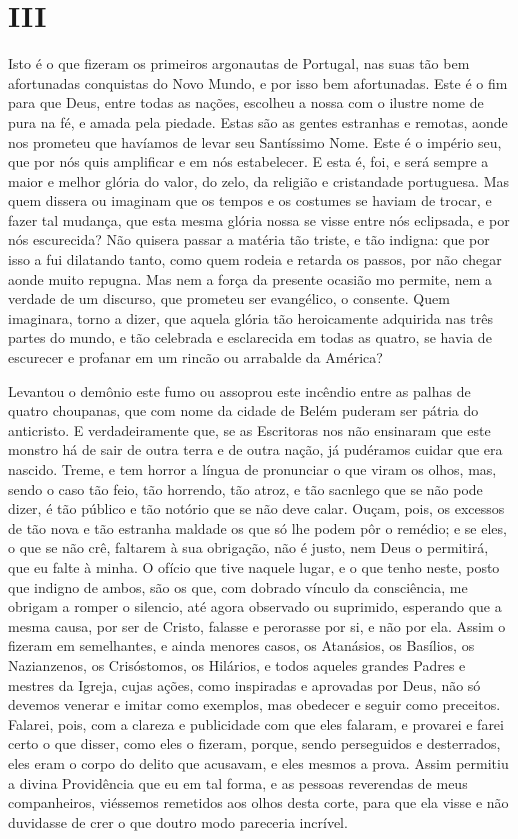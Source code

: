 \section*{III}

Isto é o que fizeram os primeiros argonautas de Portugal, nas suas tão
bem afortunadas conquistas do Novo Mundo, e por isso bem afortunadas.
Este é o fim para que Deus, entre todas as nações, escolheu a nossa com
o ilustre nome de pura na fé, e amada pela piedade. Estas são as gentes
estranhas e remotas, aonde nos prometeu que havíamos de levar seu
Santíssimo Nome. Este é o império seu, que por nós quis amplificar e em
nós estabelecer. E esta é, foi, e será sempre a maior e melhor glória do
valor, do zelo, da religião e cristandade portuguesa. Mas quem dissera
ou imaginam que os tempos e os costumes se haviam de trocar, e fazer tal
mudança, que esta mesma glória nossa se visse entre nós eclipsada, e por
nós escurecida? Não quisera passar a matéria tão triste, e tão indigna:
que por isso a fui dilatando tanto, como quem rodeia e retarda os
passos, por não chegar aonde muito repugna. Mas nem a força da
presente ocasião mo permite, nem a verdade de um discurso, que prometeu
ser evangélico, o consente. Quem imaginara, torno a dizer, que aquela
glória tão heroicamente adquirida nas três partes do mundo, e tão
celebrada e esclarecida em todas as quatro, se havia de escurecer e
profanar em um rincão ou arrabalde da América?

Levantou o demônio este fumo ou assoprou este incêndio entre as palhas
de quatro choupanas, que com nome da cidade de Belém puderam ser pátria
do anticristo. E verdadeiramente que, se as Escritoras nos não ensinaram
que este monstro há de sair de outra terra e de outra nação, já
pudéramos cuidar que era nascido. Treme, e tem horror a língua de
pronunciar o que viram os olhos, mas, sendo o caso tão feio, tão
horrendo, tão atroz, e tão sacnlego que se não pode dizer, é tão público
e tão notório que se não deve calar. Ouçam, pois, os excessos de tão
nova e tão estranha maldade os que só lhe podem pôr o remédio; e se eles,
o que se não crê, faltarem à sua obrigação, não é justo, nem Deus o
permitirá, que eu falte à minha. O ofício que tive naquele lugar, e o
que tenho neste, posto que indigno de ambos, são os que, com dobrado
vínculo da consciência, me obrigam a romper o silencio, até agora
observado ou suprimido, esperando que a mesma causa, por ser de Cristo,
falasse e perorasse por si, e não por ela. Assim o fizeram em
semelhantes, e ainda menores casos, os Atanásios, os Basílios, os
Nazianzenos, os Crisóstomos, os Hilários, e todos aqueles grandes Padres
e mestres da Igreja, cujas ações, como inspiradas e aprovadas por Deus,
não só devemos venerar e imitar como exemplos, mas obedecer e seguir
como preceitos. Falarei, pois, com a clareza e publicidade com que eles
falaram, e provarei e farei certo o que disser, como eles o fizeram,
porque, sendo perseguidos e desterrados, eles eram o corpo do delito que
acusavam, e eles mesmos a prova. Assim permitiu a divina Providência que
eu em tal forma, e as pessoas reverendas de meus companheiros, viéssemos
remetidos aos olhos desta corte, para que ela visse e não duvidasse de
crer o que doutro modo pareceria incrível.

